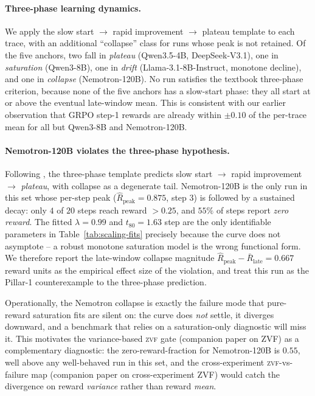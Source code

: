 \paragraph{Three-phase learning dynamics.}
\label{par:three-phase}
We apply the \citet{nimmaturi2025predictive} slow start
$\to$ rapid improvement $\to$ plateau template to each trace, with
an additional ``collapse'' class for runs whose peak is not
retained.  Of the five anchors, two fall in \emph{plateau}
(Qwen3.5-4B, DeepSeek-V3.1), one in \emph{saturation} (Qwen3-8B),
one in \emph{drift} (Llama-3.1-8B-Instruct, monotone decline), and
one in \emph{collapse} (Nemotron-120B).  No run satisfies the
textbook three-phase criterion, because none of the five anchors
has a slow-start phase: they all start at or above the eventual
late-window mean.  This is consistent with our earlier
observation that GRPO step-1 rewards are already within
$\pm 0.10$ of the per-trace mean for all but Qwen3-8B and
Nemotron-120B.

\paragraph{Nemotron-120B violates the three-phase hypothesis.}
\label{par:nemotron-collapse}
Following \citet{nimmaturi2025predictive}, the three-phase
template predicts slow start $\to$ rapid improvement $\to$
\emph{plateau}, with collapse as a degenerate tail.  Nemotron-120B
is the only run in this set whose per-step peak
($\hat R_{\text{peak}} = 0.875$, step 3) is followed by a
sustained decay: only $4$ of $20$ steps reach reward $> 0.25$, and
$55\%$ of steps report \emph{zero reward}.  The fitted $\lambda
= 0.99$ and $t_{80} = 1.63$ step are the only identifiable
parameters in Table~\ref{tab:scaling-fits} precisely because the
curve does not asymptote -- a robust monotone saturation model is
the wrong functional form.  We therefore report the late-window
collapse magnitude
$\hat R_{\text{peak}} - \bar R_{\text{late}} = 0.667$ reward units
as the empirical effect size of the violation, and treat this run
as the Pillar-1 counterexample to the three-phase prediction.

Operationally, the Nemotron collapse is exactly the failure mode
that pure-reward saturation fits are silent on: the curve does
\emph{not} settle, it diverges downward, and a benchmark that
relies on a saturation-only diagnostic will miss it.  This
motivates the variance-based \textsc{zvf} gate
(companion paper on ZVF) as a complementary diagnostic: the
zero-reward-fraction for Nemotron-120B is $0.55$, well above any
well-behaved run in this set, and the cross-experiment
\textsc{zvf}-vs-failure map
(companion paper on cross-experiment ZVF) would catch the divergence on
reward \emph{variance} rather than reward \emph{mean}.

